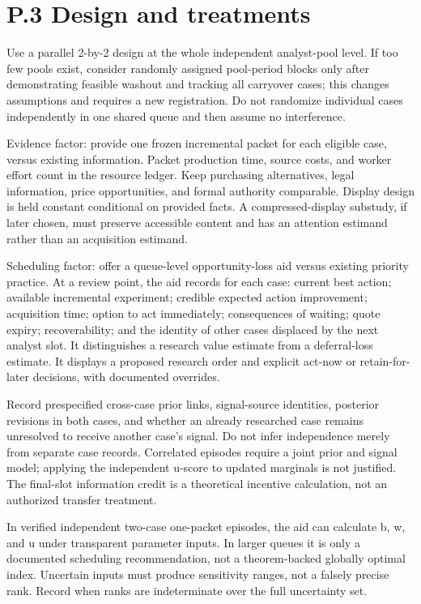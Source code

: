 \documentclass[
  11pt,
]{article}
\begin{document}
\section{P.3 Design and treatments}\label{p.3-design-and-treatments}

Use a parallel 2-by-2 design at the whole independent analyst-pool
level. If too few pools exist, consider randomly assigned pool-period
blocks only after demonstrating feasible washout and tracking all
carryover cases; this changes assumptions and requires a new
registration. Do not randomize individual cases independently in one
shared queue and then assume no interference.

Evidence factor: provide one frozen incremental packet for each eligible
case, versus existing information. Packet production time, source costs,
and worker effort count in the resource ledger. Keep purchasing
alternatives, legal information, price opportunities, and formal
authority comparable. Display design is held constant conditional on
provided facts. A compressed-display substudy, if later chosen, must
preserve accessible content and has an attention estimand rather than an
acquisition estimand.

Scheduling factor: offer a queue-level opportunity-loss aid versus
existing priority practice. At a review point, the aid records for each
case: current best action; available incremental experiment; credible
expected action improvement; acquisition time; option to act
immediately; consequences of waiting; quote expiry; recoverability; and
the identity of other cases displaced by the next analyst slot. It
distinguishes a research value estimate from a deferral-loss estimate.
It displays a proposed research order and explicit act-now or
retain-for-later decisions, with documented overrides.

Record prespecified cross-case prior links, signal-source identities,
posterior revisions in both cases, and whether an already researched
case remains unresolved to receive another case's signal. Do not infer
independence merely from separate case records. Correlated episodes
require a joint prior and signal model; applying the independent u-score
to updated marginals is not justified. The final-slot information credit
is a theoretical incentive calculation, not an authorized transfer
treatment.

In verified independent two-case one-packet episodes, the aid can
calculate b, w, and u under transparent parameter inputs. In larger
queues it is only a documented scheduling recommendation, not a
theorem-backed globally optimal index. Uncertain inputs must produce
sensitivity ranges, not a falsely precise rank. Record when ranks are
indeterminate over the full uncertainty set.
\end{document}
